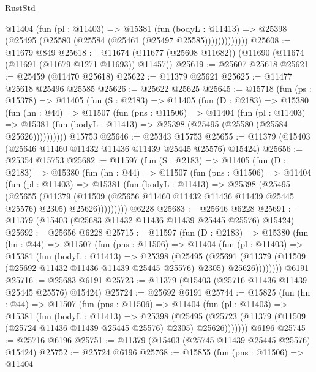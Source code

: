 \begin{lexlean}{RustStd}
\begin{coremodule}
              @11404
                (fun (pl : @11403) =>
                @15381
                  (fun (bodyL : @11413) =>
                  @25398 (@25495 (@25580 (@25584 (@25461 (@25497 @25585)))))))))))))
@25608 := @11679 @849
@25618 := @11674 (@11677 (@25608 @11682)) (@11690 (@11674 (@11691 (@11679 @1271 @11693)) @11457))
@25619 := @25607 @25618
@25621 := @25459 (@11470 @25618)
@25622 := @11379 @25621
@25625 := @11477 @25618 @25496 @25585
@25626 := @25622 @25625
@25645 := @15718
    (fun (ps : @15378) =>
    @11405
      (fun (S : @2183) =>
      @11405
        (fun (D : @2183) =>
        @15380
          (fun (hn : @44) =>
          @11507
            (fun (pns : @11506) =>
            @11404
              (fun (pl : @11403) =>
              @15381 (fun (bodyL : @11413) => @25398 (@25495 (@25580 (@25584 @25626))))))))))
    @15753
@25646 := @25343 @15753
@25655 := @11379 (@15403 (@25646 @11460 @11432 @11436 @11439 @25445 @25576) @15424)
@25656 := @25354 @15753
@25682 := @11597
    (fun (S : @2183) =>
    @11405
      (fun (D : @2183) =>
      @15380
        (fun (hn : @44) =>
        @11507
          (fun (pns : @11506) =>
          @11404
            (fun (pl : @11403) =>
            @15381
              (fun (bodyL : @11413) =>
              @25398
                (@25495
                  (@25655
                    (@11379
                      (@11509 (@25656 @11460 @11432 @11436 @11439 @25445 @25576) @2305)
                      @25626)))))))))
    @6228
@25683 := @25646 @6228
@25691 := @11379 (@15403 (@25683 @11432 @11436 @11439 @25445 @25576) @15424)
@25692 := @25656 @6228
@25715 := @11597
    (fun (D : @2183) =>
    @15380
      (fun (hn : @44) =>
      @11507
        (fun (pns : @11506) =>
        @11404
          (fun (pl : @11403) =>
          @15381
            (fun (bodyL : @11413) =>
            @25398
              (@25495
                (@25691
                  (@11379 (@11509 (@25692 @11432 @11436 @11439 @25445 @25576) @2305) @25626))))))))
    @6191
@25716 := @25683 @6191
@25723 := @11379 (@15403 (@25716 @11436 @11439 @25445 @25576) @15424)
@25724 := @25692 @6191
@25744 := @15825
    (fun (hn : @44) =>
    @11507
      (fun (pns : @11506) =>
      @11404
        (fun (pl : @11403) =>
        @15381
          (fun (bodyL : @11413) =>
          @25398
            (@25495
              (@25723 (@11379 (@11509 (@25724 @11436 @11439 @25445 @25576) @2305) @25626)))))))
    @6196
@25745 := @25716 @6196
@25751 := @11379 (@15403 (@25745 @11439 @25445 @25576) @15424)
@25752 := @25724 @6196
@25768 := @15855
    (fun (pns : @11506) =>
    @11404

\end{coremodule}
\end{lexlean}
